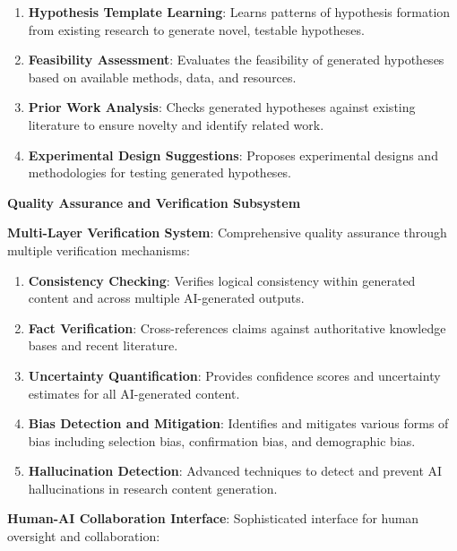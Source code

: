 \documentclass[10pt,twocolumn]{article}
\begin{document}
\begin{enumerate}
    \item \textbf{Hypothesis Template Learning}: Learns patterns of hypothesis formation from existing research to generate novel, testable hypotheses.
    
    \item \textbf{Feasibility Assessment}: Evaluates the feasibility of generated hypotheses based on available methods, data, and resources.
    
    \item \textbf{Prior Work Analysis}: Checks generated hypotheses against existing literature to ensure novelty and identify related work.
    
    \item \textbf{Experimental Design Suggestions}: Proposes experimental designs and methodologies for testing generated hypotheses.
\end{enumerate}

\textbf{Quality Assurance and Verification Subsystem}

\textbf{Multi-Layer Verification System}: Comprehensive quality assurance through multiple verification mechanisms:

\begin{enumerate}
    \item \textbf{Consistency Checking}: Verifies logical consistency within generated content and across multiple AI-generated outputs.
    
    \item \textbf{Fact Verification}: Cross-references claims against authoritative knowledge bases and recent literature.
    
    \item \textbf{Uncertainty Quantification}: Provides confidence scores and uncertainty estimates for all AI-generated content.
    
    \item \textbf{Bias Detection and Mitigation}: Identifies and mitigates various forms of bias including selection bias, confirmation bias, and demographic bias.
    
    \item \textbf{Hallucination Detection}: Advanced techniques to detect and prevent AI hallucinations in research content generation.
\end{enumerate}

\textbf{Human-AI Collaboration Interface}: Sophisticated interface for human oversight and collaboration:
\end{document}
